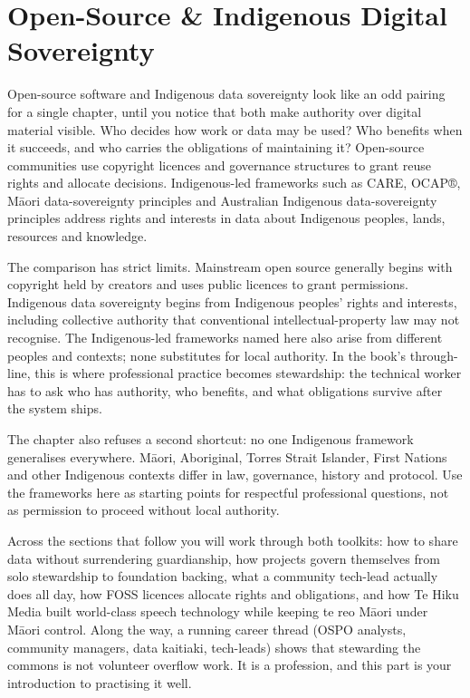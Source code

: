 
\chapter{Open-Source \& Indigenous Digital Sovereignty}


Open-source software and Indigenous data sovereignty look like an odd pairing for a single chapter, until you notice that both make authority over digital material visible. Who decides how work or data may be used? Who benefits when it succeeds, and who carries the obligations of maintaining it? Open-source communities use copyright licences and governance structures to grant reuse rights and allocate decisions. Indigenous-led frameworks such as CARE, OCAP®, Māori data-sovereignty principles and Australian Indigenous data-sovereignty principles address rights and interests in data about Indigenous peoples, lands, resources and knowledge. \autocite{osi-definition,care,ocap,te-mana-raraunga,mnw-principles}


The comparison has strict limits. Mainstream open source generally begins with copyright held by creators and uses public licences to grant permissions. Indigenous data sovereignty begins from Indigenous peoples' rights and interests, including collective authority that conventional intellectual-property law may not recognise. The Indigenous-led frameworks named here also arise from different peoples and contexts; none substitutes for local authority. In the book's through-line, this is where professional practice becomes stewardship: the technical worker has to ask who has authority, who benefits, and what obligations survive after the system ships.


The chapter also refuses a second shortcut: no one Indigenous framework generalises everywhere. Māori, Aboriginal, Torres Strait Islander, First Nations and other Indigenous contexts differ in law, governance, history and protocol. Use the frameworks here as starting points for respectful professional questions, not as permission to proceed without local authority.


Across the sections that follow you will work through both toolkits: how to share data without surrendering guardianship, how projects govern themselves from solo stewardship to foundation backing, what a community tech-lead actually does all day, how FOSS licences allocate rights and obligations, and how Te Hiku Media built world-class speech technology while keeping te reo Māori under Māori control. Along the way, a running career thread (OSPO analysts, community managers, data kaitiaki, tech-leads) shows that stewarding the commons is not volunteer overflow work. It is a profession, and this part is your introduction to practising it well.

